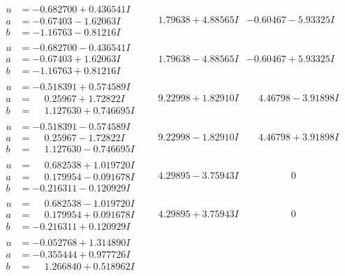 \documentclass[1p]{elsarticle_modified}
\theoremstyle{definition}
\begin{document}
$$\begin{array}{c|c|c}
\begin{aligned}
u &= -0.682700 + 0.436541 I \\
a &= -0.67403 - 1.62063 I \\
b &= -1.16763 - 0.81216 I\end{aligned}
 & \phantom{-}1.79638 + 4.88565 I & -0.60467 - 5.93325 I \\ \hline\begin{aligned}
u &= -0.682700 - 0.436541 I \\
a &= -0.67403 + 1.62063 I \\
b &= -1.16763 + 0.81216 I\end{aligned}
 & \phantom{-}1.79638 - 4.88565 I & -0.60467 + 5.93325 I \\ \hline\begin{aligned}
u &= -0.518391 + 0.574589 I \\
a &= \phantom{-}0.25967 + 1.72822 I \\
b &= \phantom{-}1.127630 + 0.746695 I\end{aligned}
 & \phantom{-}9.22998 + 1.82910 I & \phantom{-}4.46798 - 3.91898 I \\ \hline\begin{aligned}
u &= -0.518391 - 0.574589 I \\
a &= \phantom{-}0.25967 - 1.72822 I \\
b &= \phantom{-}1.127630 - 0.746695 I\end{aligned}
 & \phantom{-}9.22998 - 1.82910 I & \phantom{-}4.46798 + 3.91898 I \\ \hline\begin{aligned}
u &= \phantom{-}0.682538 + 1.019720 I \\
a &= \phantom{-}0.179954 - 0.091678 I \\
b &= -0.216311 - 0.120929 I\end{aligned}
 & \phantom{-}4.29895 - 3.75943 I & \phantom{-0.000000 } 0 \\ \hline\begin{aligned}
u &= \phantom{-}0.682538 - 1.019720 I \\
a &= \phantom{-}0.179954 + 0.091678 I \\
b &= -0.216311 + 0.120929 I\end{aligned}
 & \phantom{-}4.29895 + 3.75943 I & \phantom{-0.000000 } 0 \\ \hline\begin{aligned}
u &= -0.052768 + 1.314890 I \\
a &= -0.355444 + 0.977726 I \\
b &= \phantom{-}1.266840 + 0.518962 I\end{aligned}

\end{array}$$
\end{document}
